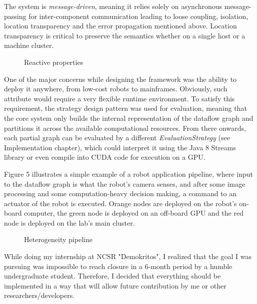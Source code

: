 \documentclass{dithesis}
\begin{document}
The system is \textit{message-driven}, meaning it relies solely on asynchronous message-passing for inter-component communication leading to loose coupling, isolation, location transparency and the error propagation mentioned above. Location transparency is critical to preserve the semantics whether on a single host or a machine cluster. 

\begin{figure}[h!] \begin{center}    
  	 
  	\caption{Reactive properties}
\end{center} \end{figure}


One of the major concerns while designing the framework was the ability to deploy it anywhere, from low-cost robots to mainframes. Obviously, such attribute would require a very flexible runtime environment. To satisfy this requirement, the strategy design pattern was used for evaluation, meaning that the core system only builds the internal representation of the dataflow graph and partitions it across the available computational resources. From there onwards, each partial graph can be evaluated by a different \textit{EvaluationStrategy} (see Implementation chapter), which could interpret it using the Java 8 Streams library or even compile into CUDA code for execution on a GPU.

Figure 5 illustrates a simple example of a robot application pipeline, where input to the dataflow graph is what the robot's camera senses, and after some image processing and some computation-heavy decision making, a command to an actuator of the robot is executed. Orange nodes are deployed on the robot's on-board computer, the green node is deployed on an off-board GPU and the red node is deployed on the lab's main cluster.

\begin{figure}[h!] \begin{center}    
 	 
  	\caption{Heterogeneity pipeline}
\end{center} \end{figure}


While doing my internship at NCSR "Demokritos", I realized that the goal I was pursuing was impossible to reach closure in a 6-month period by a humble undergraduate student. Therefore, I decided that everything should be implemented in a way that will allow future contribution by me or other researchers/developers. 
\end{document}
